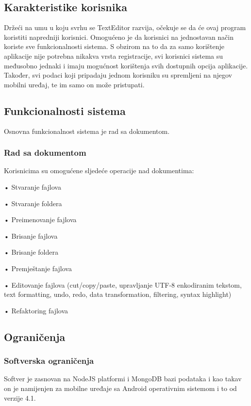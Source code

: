 \documentclass[12pt]{article}
\begin{document}
\subsection{Karakteristike korisnika}

Držeći na umu u koju svrhu se TextEditor razvija, očekuje se
da će ovaj program koristiti napredniji korisnici.
Omogućeno je da korisnici na jednostavan način koriste sve funkcionalnosti sistema. S obzirom na to da za samo korištenje aplikacije nije potrebna nikakva vrsta registracije, svi korisnici sistema su međusobno jednaki i imaju mogućnost korištenja svih dostupnih opcija aplikacije. Također, svi podaci koji pripadaju jednom korisniku su spremljeni na njegov mobilni uređaj, te im samo on može pristupati.

\subsection{Funkcionalnosti sistema}

Osnovna funkcionalnost sistema je rad sa dokumentom.

\subsubsection{Rad sa dokumentom}

Korisnicima su omogućene sljedeće operacije nad dokumentima:

•   Stvaranje fajlova

•	Stvaranje foldera

•	Preimenovanje fajlova

•	Brisanje fajlova

•	Brisanje foldera

•	Premještanje fajlova

•	Editovanje fajlova (cut/copy/paste, upravljanje UTF-8 enkodiranim tekstom, text formatting, undo, redo, data transformation, filtering, syntax highlight)

•	Refaktoring fajlova


\subsection{Ograničenja}

\subsubsection{Softverska ograničenja}

Softver je zasnovan na NodeJS platformi i MongoDB bazi podataka i kao takav on je namijenjen za mobilne uređaje sa Android operativnim sistemom i to od verzije 4.1.
\end{document}
